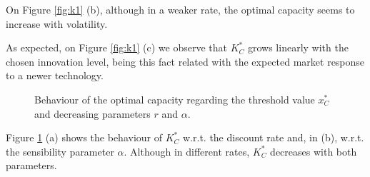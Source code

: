 On Figure \ref{fig:k1} (b), although in a weaker rate, the optimal capacity seems to increase with volatility.

As expected, on Figure \ref{fig:k1} (c) we observe that $K^*_C$ grows linearly with the chosen innovation level, being this fact related with the expected market response to a newer technology.



\begin{figure}[!htb]
	\begin{subfigmatrix}{2}
	\end{subfigmatrix}
	\caption{Behaviour of the optimal capacity regarding the threshold value $x^*_C$ and decreasing parameters $r$ and $\alpha$.}
	\label{fig:k2}
\end{figure}

Figure \ref{fig:k2} (a) shows the behaviour of $K^*_C$ w.r.t. the discount rate and, in (b), w.r.t. the sensibility parameter $\alpha$. Although in different rates, $K_C^*$ decreases with both parameters.
 
